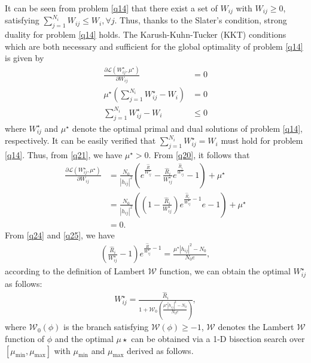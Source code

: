 \documentclass[journal]{IEEEtran}
\begin{document}
It can be seen from problem \eqref{q14} that there exist a set of $W_{ij}$ with $W_{ij} \geq 0$, satisfying $\sum\limits_{j = 1}^{N_i} W_{ij} \leq W_i, \forall j$. Thus, thanks to the Slater's condition, strong duality for problem \eqref{q14} holds. The Karush-Kuhn-Tucker (KKT) conditions which are both necessary and 	sufficient for the  global optimality of problem \eqref{q14} is given by
\begin{align}
\frac{\partial \mathcal{L}\left({W_{ij}^\star}, \mu^\star\right)}{\partial W_{ij}} &= 0 \label{q20} \\
\mu^\star\left(\sum\limits_{j = 1}^{N_i}W_{ij}^\star - W_i\right) &= 0 \label{q21} \\
\sum\limits_{j = 1}^{N_i}W_{ij}^\star - W_i & \leq 0 \label{q22}
\end{align} 
where $W_{ij}^\star$ and $\mu^\star$ denote the optimal primal and dual solutions of problem \eqref{q14}, respectively. It can be easily verified that $\sum\limits_{j = 1}^{N_i} W_{ij}^\star = W_i$ must hold for problem \eqref{q14}. Thus, from \eqref{q21}, we have $\mu^\star > 0$. From \eqref{q20}, it follows that 
\begin{align}
\frac{\partial \mathcal{L} \left(W_{ij}^\star, \mu^\star \right)}{\partial W_{ij}} &= \frac{N_0}{\left|h_{ij}\right|^2} \left(e^{\frac{\hat{R}}{W_{ij}^\star}} -  \frac{\hat{R}_i}{W_{ij}^\star} e^{\frac{\hat{R}_i}{W_{ij}^\star}} - 1\right) + \mu^\star \label{q24} \\
& =  \frac{N_0}{\left|h_{ij}\right|^2}\left(\left(1 - \frac{\hat{R}_i}{W_{ij}^\star}\right)e^{\frac{\hat{R}_i}{W_{ij}^\star} - 1}e - 1\right) + \mu^\star \\
& = 0. \label{q25}
\end{align}
From \eqref{q24} and \eqref{q25}, we have
\begin{align}
\left(\frac{\hat{R}_i}{W_{ij}^\star} - 1\right) e^{\frac{\hat{R}}{W_{ij}^\star} - 1} = \frac{\mu^\star \left|h_{ij}\right|^2 - N_0}{N_0 e},
\end{align}
according to the definition of Lambert $\mathcal{W}$ function, we can obtain the optimal $W_{ij}^\star$ as follows:
\begin{align}
W_{ij}^\star = \frac{\hat{R}_i}{1 + \mathcal{W}_0\left(\frac{\mu^\star \left|h_{ij}\right|^2 - N_0}{N_0 e}\right)} \label{q29},
\end{align}
where $\mathcal{W}_0\left(\phi\right)$ is the branch satisfying $\mathcal{W}\left(\phi\right) \geq -1$, $\mathcal{W}$ denotes the Lambert $\mathcal{W}$ function of $\phi$ \cite{RMCorless} and the optimal $\mu\star$ can be obtained via a 1-D bisection search over $\left[\mu_{\mbox{min}}, \mu_{\mbox{max}}\right]$ with $\mu_{\mbox{min}} $ and $\mu_{\mbox{max}}$ derived as follows.
\end{document}
